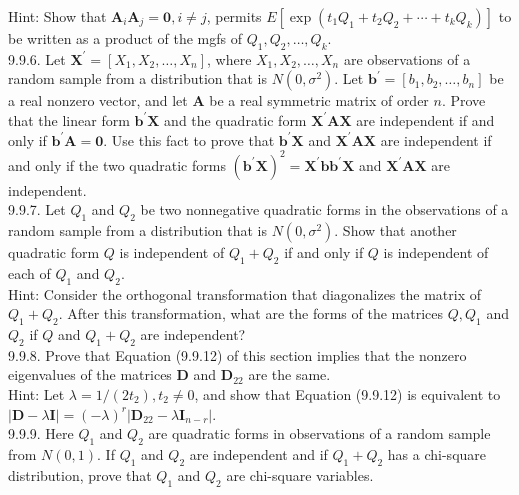 Hint: Show that $\boldsymbol{A}_{i} \boldsymbol{A}_{j}=\mathbf{0}, i \neq j$, permits $E\left[\exp \left(t_{1} Q_{1}+t_{2} Q_{2}+\cdots+t_{k} Q_{k}\right)\right]$ to be written as a product of the mgfs of $Q_{1}, Q_{2}, \ldots, Q_{k}$.\\
9.9.6. Let $\boldsymbol{X}^{\prime}=\left[X_{1}, X_{2}, \ldots, X_{n}\right]$, where $X_{1}, X_{2}, \ldots, X_{n}$ are observations of a random sample from a distribution that is $N\left(0, \sigma^{2}\right)$. Let $\boldsymbol{b}^{\prime}=\left[b_{1}, b_{2}, \ldots, b_{n}\right]$ be a real nonzero vector, and let $\boldsymbol{A}$ be a real symmetric matrix of order $n$. Prove that the linear form $\boldsymbol{b}^{\prime} \boldsymbol{X}$ and the quadratic form $\boldsymbol{X}^{\prime} \boldsymbol{A} \boldsymbol{X}$ are independent if and only if $\boldsymbol{b}^{\prime} \boldsymbol{A}=\mathbf{0}$. Use this fact to prove that $\boldsymbol{b}^{\prime} \boldsymbol{X}$ and $\boldsymbol{X}^{\prime} \boldsymbol{A} \boldsymbol{X}$ are independent if and only if the two quadratic forms $\left(\boldsymbol{b}^{\prime} \boldsymbol{X}\right)^{2}=\boldsymbol{X}^{\prime} \boldsymbol{b} \boldsymbol{b}^{\prime} \boldsymbol{X}$ and $\boldsymbol{X}^{\prime} \boldsymbol{A} \boldsymbol{X}$ are independent.\\
9.9.7. Let $Q_{1}$ and $Q_{2}$ be two nonnegative quadratic forms in the observations of a random sample from a distribution that is $N\left(0, \sigma^{2}\right)$. Show that another quadratic form $Q$ is independent of $Q_{1}+Q_{2}$ if and only if $Q$ is independent of each of $Q_{1}$ and $Q_{2}$.\\
Hint: Consider the orthogonal transformation that diagonalizes the matrix of $Q_{1}+Q_{2}$. After this transformation, what are the forms of the matrices $Q, Q_{1}$ and $Q_{2}$ if $Q$ and $Q_{1}+Q_{2}$ are independent?\\
9.9.8. Prove that Equation (9.9.12) of this section implies that the nonzero eigenvalues of the matrices $\boldsymbol{D}$ and $\boldsymbol{D}_{22}$ are the same.\\
Hint: Let $\lambda=1 /\left(2 t_{2}\right), t_{2} \neq 0$, and show that Equation (9.9.12) is equivalent to $|\boldsymbol{D}-\lambda \boldsymbol{I}|=(-\lambda)^{r}\left|\boldsymbol{D}_{22}-\lambda \boldsymbol{I}_{n-r}\right|$.\\
9.9.9. Here $Q_{1}$ and $Q_{2}$ are quadratic forms in observations of a random sample from $N(0,1)$. If $Q_{1}$ and $Q_{2}$ are independent and if $Q_{1}+Q_{2}$ has a chi-square distribution, prove that $Q_{1}$ and $Q_{2}$ are chi-square variables.\\
